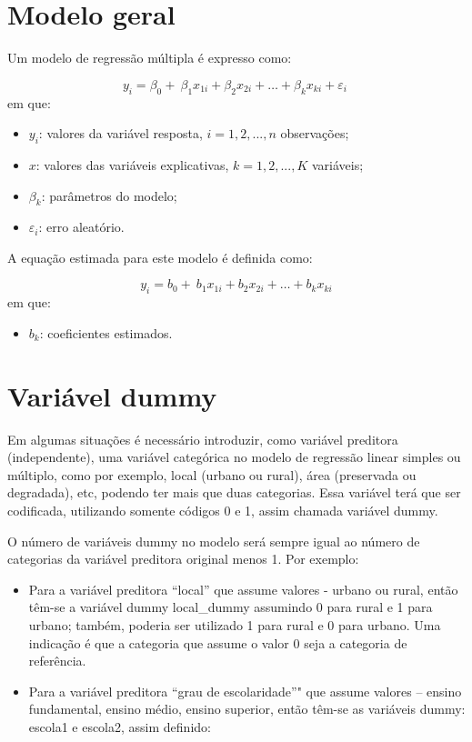 \documentclass[12pt,brazil,]{book}
\providecommand{\tightlist}{%
  \setlength{\itemsep}{0pt}\setlength{\parskip}{0pt}}
\begin{document}
\hypertarget{modelo-geral}{%
\section{Modelo geral}\label{modelo-geral}}

Um modelo de regressão múltipla é expresso como:

\[ 
y_{i} = \beta_0+\ \beta_1x_{1i}+\beta_2x_{2i}+\dots+\beta_kx_{ki}+\varepsilon_i\ 
\] \noindent em que:

\begin{itemize}
\item
  \(y_{i}\): valores da variável resposta, \(i = 1, 2,..., n\)
  observações;
\item
  \(x\): valores das variáveis explicativas, \(k = 1, 2,..., K\)
  variáveis;
\item
  \(\beta_k\): parâmetros do modelo;
\item
  \(\varepsilon_i\): erro aleatório.
\end{itemize}

A equação estimada para este modelo é definida como:

\[ 
y_{i} = b_0+\ b_1x_{1i}+b_2x_{2i}+\dots+b_kx_{ki} 
\] em que:

\begin{itemize}
\tightlist
\item
  \(b_k\): coeficientes estimados.
\end{itemize}

\hypertarget{variavel-dummy}{%
\section{Variável dummy}\label{variavel-dummy}}

Em algumas situações é necessário introduzir, como variável preditora
(independente), uma variável categórica no modelo de regressão linear
simples ou múltiplo, como por exemplo, local (urbano ou rural), área
(preservada ou degradada), etc, podendo ter mais que duas categorias.
Essa variável terá que ser codificada, utilizando somente códigos 0 e 1,
assim chamada variável dummy.

O número de variáveis dummy no modelo será sempre igual ao número de
categorias da variável preditora original menos 1. Por exemplo:

\begin{itemize}
\item
  Para a variável preditora ``local'' que assume valores - urbano ou
  rural, então têm-se a variável dummy local\_dummy assumindo 0 para
  rural e 1 para urbano; também, poderia ser utilizado 1 para rural e 0
  para urbano. Uma indicação é que a categoria que assume o valor 0 seja
  a categoria de referência.
\item
  Para a variável preditora ``grau de escolaridade''" que assume valores
  -- ensino fundamental, ensino médio, ensino superior, então têm-se as
  variáveis dummy: escola1 e escola2, assim definido:
\end{itemize}
\end{document}
